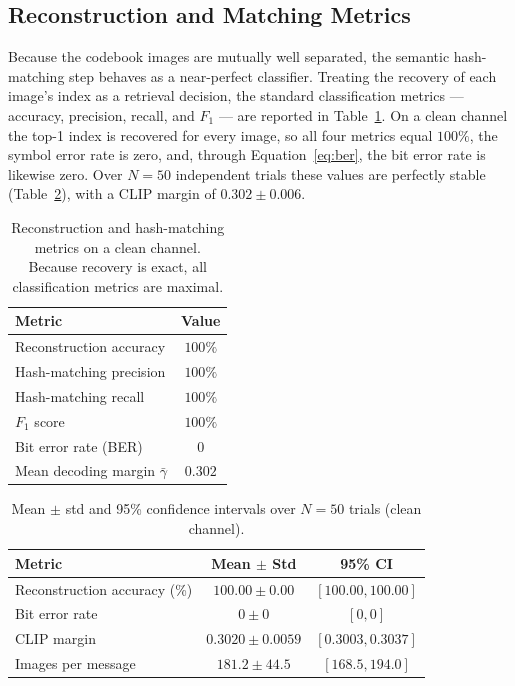 \documentclass[10pt,a4paper]{article}
\theoremstyle{definition}
\begin{document}
\subsection{Reconstruction and Matching Metrics}\label{sec:metrics}
Because the codebook images are mutually well separated, the semantic
hash-matching step behaves as a near-perfect classifier. Treating the recovery of
each image's index as a retrieval decision, the standard classification metrics
--- accuracy, precision, recall, and $F_1$ --- are reported in
Table~\ref{tab:prf1}. On a clean channel the top-1 index is recovered for every
image, so all four metrics equal $100\%$, the symbol error rate is zero, and,
through Equation~\eqref{eq:ber}, the bit error rate is likewise zero. Over $N{=}50$
independent trials these values are perfectly stable (Table~\ref{tab:stats}), with a
CLIP margin of $0.302\pm0.006$.

\begin{table}[t]
\centering
\caption{Reconstruction and hash-matching metrics on a clean channel. Because recovery is exact, all classification metrics are maximal.}\label{tab:prf1}
\begin{tabular}{@{}lc@{}}
\toprule
Metric & Value \\
\midrule
Reconstruction accuracy & $100\%$ \\
Hash-matching precision  & $100\%$ \\
Hash-matching recall     & $100\%$ \\
$F_1$ score              & $100\%$ \\
Bit error rate (BER)     & $0$ \\
Mean decoding margin $\bar\gamma$ & $0.302$ \\
\bottomrule
\end{tabular}
\end{table}

\begin{table}[t]
\centering
\caption{Mean $\pm$ std and 95\% confidence intervals over $N{=}50$ trials (clean channel).}\label{tab:stats}
\begin{tabular}{@{}lcc@{}}
\toprule
Metric & Mean $\pm$ Std & 95\% CI \\
\midrule
Reconstruction accuracy (\%) & $100.00\pm0.00$ & $[100.00,100.00]$ \\
Bit error rate               & $0\pm0$         & $[0,0]$ \\
CLIP margin                  & $0.3020\pm0.0059$ & $[0.3003,0.3037]$ \\
Images per message           & $181.2\pm44.5$  & $[168.5,194.0]$ \\
\bottomrule
\end{tabular}
\end{table}
\end{document}
